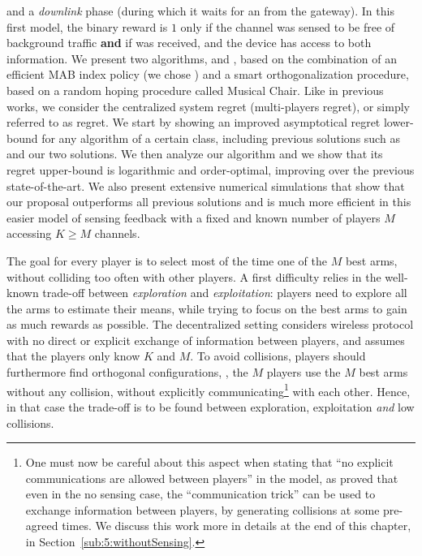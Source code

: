 and a \emph{downlink} phase (during which it waits for an \Ack{} from the gateway).
In this first model, the binary reward is $1$ only if the channel was sensed to be free of background traffic \textbf{and} if \Ack{} was received, and the device has access to both information.
We present two algorithms, \RandTopM{} and \MCTopM, based on the combination of an efficient MAB index policy (we chose \klUCB) and a smart orthogonalization procedure, based on a random hoping procedure called Musical Chair.
Like in previous works, we consider the centralized system regret (multi-players regret), or simply referred to as regret.
We start by showing an improved asymptotical regret lower-bound for any algorithm of a certain class, including previous solutions such as \rhoRand{} and our two solutions.
We then analyze our \MCTopM{} algorithm and we show that its regret upper-bound is logarithmic and order-optimal, improving over the previous state-of-the-art.
We also present extensive numerical simulations that show that our proposal outperforms all previous solutions and is much more efficient in this easier model of sensing feedback with a fixed and known number of players $M$ accessing $K \geq M$ channels.



The goal for every player is to select most of the time one of the $M$ best arms, without colliding too often with other players.
A first difficulty relies in the well-known trade-off between \emph{exploration} and \emph{exploitation}: players need to explore all the arms to estimate their means, while trying to focus on the best arms to gain as much rewards as possible.
The decentralized setting considers wireless protocol with no direct or explicit exchange of information between players, and assumes that the players only know $K$ and $M$. To avoid collisions, players should furthermore find orthogonal configurations, \ie, the $M$ players use the $M$ best arms without any collision, without explicitly communicating\footnote{One must now be careful about this aspect when stating that ``no explicit communications are allowed between players'' in the model, as \cite{BoursierPerchet18} proved that even in the no sensing case, the ``communication trick'' can be used to exchange information between players, by generating collisions at some pre-agreed times. We discuss this work more in details at the end of this chapter, in Section~\ref{sub:5:withoutSensing}.} with each other.
Hence, in that case the trade-off is to be found between exploration, exploitation \emph{and} low collisions.

